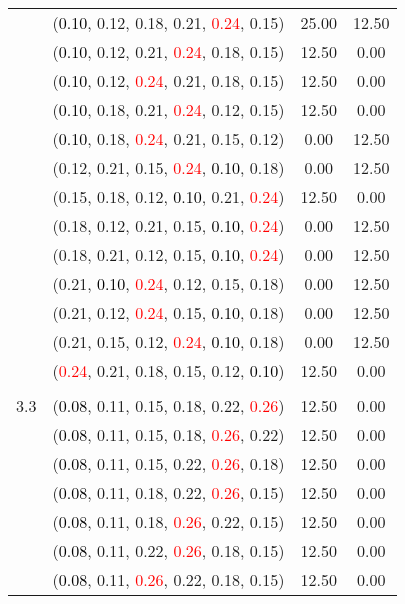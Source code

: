 \documentclass[10pt,a4paper]{report}
\begin{document}
\begin{center}
\begin{longtable}{clcc}
			&(\textcolor{black}{0.10}, 0.12, 0.18, 0.21, \textcolor{red}{0.24}, 0.15)&25.00&12.50\\
			&(\textcolor{black}{0.10}, 0.12, 0.21, \textcolor{red}{0.24}, 0.18, 0.15)&12.50&0.00\\
			&(\textcolor{black}{0.10}, 0.12, \textcolor{red}{0.24}, 0.21, 0.18, 0.15)&12.50&0.00\\
			&(\textcolor{black}{0.10}, 0.18, 0.21, \textcolor{red}{0.24}, 0.12, 0.15)&12.50&0.00\\
			&(\textcolor{black}{0.10}, 0.18, \textcolor{red}{0.24}, 0.21, 0.15, 0.12)&0.00&12.50\\
			&(0.12, 0.21, 0.15, \textcolor{red}{0.24}, \textcolor{black}{0.10}, 0.18)&0.00&12.50\\
			&(0.15, 0.18, 0.12, \textcolor{black}{0.10}, 0.21, \textcolor{red}{0.24})&12.50&0.00\\
			&(0.18, 0.12, 0.21, 0.15, \textcolor{black}{0.10}, \textcolor{red}{0.24})&0.00&12.50\\
			&(0.18, 0.21, 0.12, 0.15, \textcolor{black}{0.10}, \textcolor{red}{0.24})&0.00&12.50\\
			&(0.21, \textcolor{black}{0.10}, \textcolor{red}{0.24}, 0.12, 0.15, 0.18)&0.00&12.50\\
			&(0.21, 0.12, \textcolor{red}{0.24}, 0.15, \textcolor{black}{0.10}, 0.18)&0.00&12.50\\
			&(0.21, 0.15, 0.12, \textcolor{red}{0.24}, \textcolor{black}{0.10}, 0.18)&0.00&12.50\\
			&(\textcolor{red}{0.24}, 0.21, 0.18, 0.15, 0.12, \textcolor{black}{0.10})&12.50&0.00\\
		&&&\\
		3.3			&(\textcolor{black}{0.08}, 0.11, 0.15, 0.18, 0.22, \textcolor{red}{0.26})&12.50&0.00\\
			&(\textcolor{black}{0.08}, 0.11, 0.15, 0.18, \textcolor{red}{0.26}, 0.22)&12.50&0.00\\
			&(\textcolor{black}{0.08}, 0.11, 0.15, 0.22, \textcolor{red}{0.26}, 0.18)&12.50&0.00\\
			&(\textcolor{black}{0.08}, 0.11, 0.18, 0.22, \textcolor{red}{0.26}, 0.15)&12.50&0.00\\
			&(\textcolor{black}{0.08}, 0.11, 0.18, \textcolor{red}{0.26}, 0.22, 0.15)&12.50&0.00\\
			&(\textcolor{black}{0.08}, 0.11, 0.22, \textcolor{red}{0.26}, 0.18, 0.15)&12.50&0.00\\
			&(\textcolor{black}{0.08}, 0.11, \textcolor{red}{0.26}, 0.22, 0.18, 0.15)&12.50&0.00\\

\end{longtable}
\end{center}
\end{document}
